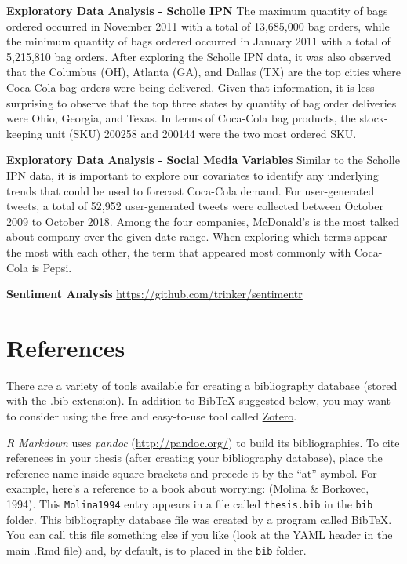 \documentclass[12pt,oneside]{chicagocapstone}
\begin{document}
\textbf{Exploratory Data Analysis - Scholle IPN} The maximum quantity of
bags ordered occurred in November 2011 with a total of 13,685,000 bag
orders, while the minimum quantity of bags ordered occurred in January
2011 with a total of 5,215,810 bag orders. After exploring the Scholle
IPN data, it was also observed that the Columbus (OH), Atlanta (GA), and
Dallas (TX) are the top cities where Coca-Cola bag orders were being
delivered. Given that information, it is less surprising to observe that
the top three states by quantity of bag order deliveries were Ohio,
Georgia, and Texas. In terms of Coca-Cola bag products, the
stock-keeping unit (SKU) 200258 and 200144 were the two most ordered
SKU.

\textbf{Exploratory Data Analysis - Social Media Variables} Similar to
the Scholle IPN data, it is important to explore our covariates to
identify any underlying trends that could be used to forecast Coca-Cola
demand. For user-generated tweets, a total of 52,952 user-generated
tweets were collected between October 2009 to October 2018. Among the
four companies, McDonald's is the most talked about company over the
given date range. When exploring which terms appear the most with each
other, the term that appeared most commonly with Coca-Cola is Pepsi.

\textbf{Sentiment Analysis} \url{https://github.com/trinker/sentimentr}

\backmatter

\chapter*{References}\label{references}


\noindent

\setlength{\parindent}{-0.20in} \setlength{\leftskip}{0.20in}
\setlength{\parskip}{8pt}

There are a variety of tools available for creating a bibliography
database (stored with the .bib extension). In addition to BibTeX
suggested below, you may want to consider using the free and easy-to-use
tool called \href{https://www.zotero.org/}{Zotero}.

\emph{R Markdown} uses \emph{pandoc} (\url{http://pandoc.org/}) to build
its bibliographies. To cite references in your thesis (after creating
your bibliography database), place the reference name inside square
brackets and precede it by the ``at'' symbol. For example, here's a
reference to a book about worrying: (Molina \& Borkovec, 1994). This
\texttt{Molina1994} entry appears in a file called \texttt{thesis.bib}
in the \texttt{bib} folder. This bibliography database file was created
by a program called BibTeX. You can call this file something else if you
like (look at the YAML header in the main .Rmd file) and, by default, is
to placed in the \texttt{bib} folder.
\end{document}
